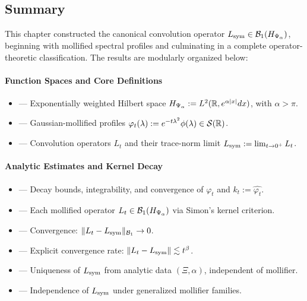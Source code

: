 \subsection*{Summary}

This chapter constructed the canonical convolution operator \( L_{\mathrm{sym}} \in \mathcal{B}_1(H_{\Psi_\alpha}) \), beginning with mollified spectral profiles and culminating in a complete operator-theoretic classification. The results are modularly organized below:

\paragraph{Function Spaces and Core Definitions}
\begin{itemize}
  \item {} — Exponentially weighted Hilbert space \( H_{\Psi_\alpha} := L^2(\mathbb{R}, e^{\alpha |x|} dx) \), with \( \alpha > \pi \).
  \item {} — Gaussian-mollified profiles \( \varphi_t(\lambda) := e^{-t\lambda^2} \phi(\lambda) \in \mathcal{S}(\mathbb{R}) \).
  \item {} — Convolution operators \( L_t \) and their trace-norm limit \( L_{\mathrm{sym}} := \lim_{t \to 0^+} L_t \).
\end{itemize}

\paragraph{Analytic Estimates and Kernel Decay}
\begin{itemize}
  \item {} — Decay bounds, integrability, and convergence of \( \varphi_t \) and \( k_t := \widehat{\varphi_t} \).
  \item {} — Each mollified operator \( L_t \in \mathcal{B}_1(H_{\Psi_\alpha}) \) via Simon's kernel criterion.
  \item {} — Convergence: \( \|L_t - L_{\mathrm{sym}}\|_{\mathcal{B}_1} \to 0 \).
  \item {} — Explicit convergence rate: \( \|L_t - L_{\mathrm{sym}}\| \lesssim t^\beta \).
  \item {} — Uniqueness of \( L_{\mathrm{sym}} \) from analytic data \( (\Xi, \alpha) \), independent of mollifier.
  \item {} — Independence of \( L_{\mathrm{sym}} \) under generalized mollifier families.
\end{itemize}

